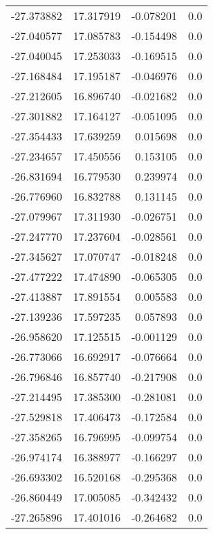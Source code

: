 \begin{tabular}{rrrr}
      -27.373882 &        17.317919 &   -0.078201 &   0.0 \\
      -27.040577 &        17.085783 &   -0.154498 &   0.0 \\
      -27.040045 &        17.253033 &   -0.169515 &   0.0 \\
      -27.168484 &        17.195187 &   -0.046976 &   0.0 \\
      -27.212605 &        16.896740 &   -0.021682 &   0.0 \\
      -27.301882 &        17.164127 &   -0.051095 &   0.0 \\
      -27.354433 &        17.639259 &    0.015698 &   0.0 \\
      -27.234657 &        17.450556 &    0.153105 &   0.0 \\
      -26.831694 &        16.779530 &    0.239974 &   0.0 \\
      -26.776960 &        16.832788 &    0.131145 &   0.0 \\
      -27.079967 &        17.311930 &   -0.026751 &   0.0 \\
      -27.247770 &        17.237604 &   -0.028561 &   0.0 \\
      -27.345627 &        17.070747 &   -0.018248 &   0.0 \\
      -27.477222 &        17.474890 &   -0.065305 &   0.0 \\
      -27.413887 &        17.891554 &    0.005583 &   0.0 \\
      -27.139236 &        17.597235 &    0.057893 &   0.0 \\
      -26.958620 &        17.125515 &   -0.001129 &   0.0 \\
      -26.773066 &        16.692917 &   -0.076664 &   0.0 \\
      -26.796846 &        16.857740 &   -0.217908 &   0.0 \\
      -27.214495 &        17.385300 &   -0.281081 &   0.0 \\
      -27.529818 &        17.406473 &   -0.172584 &   0.0 \\
      -27.358265 &        16.796995 &   -0.099754 &   0.0 \\
      -26.974174 &        16.388977 &   -0.166297 &   0.0 \\
      -26.693302 &        16.520168 &   -0.295368 &   0.0 \\
      -26.860449 &        17.005085 &   -0.342432 &   0.0 \\
      -27.265896 &        17.401016 &   -0.264682 &   0.0 \\

\end{tabular}
